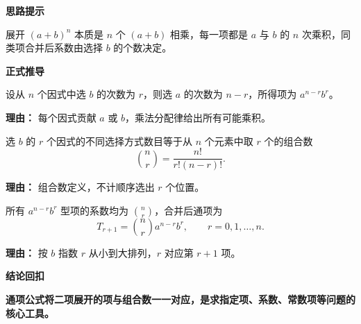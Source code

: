 \begin{proofbox}
	\textbf{\textcolor{CProof}{思路提示}}

	展开 $(a+b)^n$ 本质是 $n$ 个 $(a+b)$ 相乘，每一项都是 $a$ 与 $b$ 的 $n$ 次乘积，同类项合并后系数由选择 $b$ 的个数决定。

	\medskip
	\textbf{\textcolor{CProof}{正式推导}}
	\begin{description}[style=nextline, leftmargin=2.8em, labelsep=0.5em, itemsep=0.55em]
		\item[\textbf{步骤一（展开一般项）：}]
			设从 $n$ 个因式中选 $b$ 的次数为 $r$，则选 $a$ 的次数为 $n-r$，所得项为 $a^{n-r}b^{r}$。
			\par\textbf{理由：}
			每个因式贡献 $a$ 或 $b$，乘法分配律给出所有可能乘积。

		\item[\textbf{步骤二（组合计数）：}]
			选 $b$ 的 $r$ 个因式的不同选择方式数目等于从 $n$ 个元素中取 $r$ 个的组合数
			\[
				\binom{n}{r} = \frac{n!}{r!(n-r)!}.
			\]
			\par\textbf{理由：}
			组合数定义，不计顺序选出 $r$ 个位置。

		\item[\textbf{步骤三（合并同类项）：}]
			所有 $a^{n-r}b^{r}$ 型项的系数均为 $\binom{n}{r}$，合并后通项为
			\[
				T_{r+1} = \binom{n}{r} a^{n-r}b^{r},
				\qquad
				r=0,1,\dots,n.
			\]
			\par\textbf{理由：}
			按 $b$ 指数 $r$ 从小到大排列，$r$ 对应第 $r+1$ 项。
	\end{description}

	\medskip
	\textbf{\textcolor{CProof}{结论回扣}}

	\textbf{通项公式将二项展开的项与组合数一一对应，是求指定项、系数、常数项等问题的核心工具。}
\end{proofbox}
